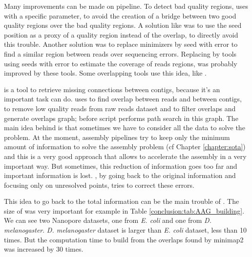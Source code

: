 \documentclass[main.tex]{subfiles}
\begin{document}
Many improvements can be made on \yacrd pipeline. To detect bad quality regions, \yacrd uses \minimap with a specific parameter, to avoid the creation of a bridge between two good quality regions over the bad quality regions. A solution like \miniscrub was to use the seed position as a proxy of a quality region instead of the overlap, to directly avoid this trouble. Another solution was to replace minimizers by seed with error to find a similar region between reads over sequencing errors. Replacing \minimap by tools using seeds with error to estimate the coverage of reads regions, was probably improved by these tools. Some overlapping tools use this idea, like \cite{GroupK}. 

\knot is a tool to retrieve missing connections between contigs, because it's an important task \knot can do. \knot uses \minimap to find overlap between reads and between contigs, \yacrd to remove low quality reads from raw reads dataset and \fpa to filter overlaps and generate overlaps graph; before \knot script performs path search in this graph. The main idea behind \knot is that sometimes we have to consider all the data to solve the problem. At the moment, assembly pipelines try to keep only the minimum amount of information to solve the assembly problem (cf Chapter \ref{chapter:sota}) and this is a very good approach that allows to accelerate the assembly in a very important way. But sometimes, this reduction of information goes too far and important information is lost. \knot, by going back to the original information and focusing only on unresolved points, tries to correct these errors.

\bigskip

This idea to go back to the total information can be the main trouble of \knot.
The size of \knot \OLC was very important for example in Table \ref{conclusion:tab:AAG_building}. 
We can see two Nanopore datasets, one from \textit{E. coli} and one from \textit{D. melanogaster}. \textit{D. melanogaster} dataset is larger than \textit{E. coli} dataset, less than 10 times. But the computation time to build \knot \OLC from the overlaps found by minimap2 was increased by 30 times.
\end{document}
